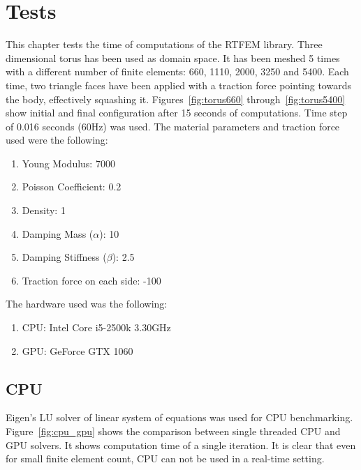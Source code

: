 \documentclass[en]{minipw} %
\begin{document}

\chapter{Tests}
\label{chap:tests}
This chapter tests the time of computations of the RTFEM library. Three dimensional torus has been used as domain space. It has been meshed 5 times with a different number of finite elements: 660, 1110, 2000, 3250 and 5400. Each time, two triangle faces have been applied with a traction force pointing towards the body, effectively squashing it. Figures~\ref{fig:torus660} through~\ref{fig:torus5400} show initial and final configuration after 15 seconds of computations. Time step of 0.016 seconds (60Hz) was used. The material parameters and traction force used were the following:
\begin{enumerate}
\item Young Modulus: 7000
\item Poisson Coefficient: 0.2
\item Density: 1
\item Damping Mass ($\alpha$): 10
\item Damping Stiffness ($\beta$): 2.5
\item Traction force on each side: -100
\end{enumerate}

The hardware used was the following:
\begin{enumerate}
\item CPU: Intel Core i5-2500k 3.30GHz
\item GPU: GeForce GTX 1060
\end{enumerate}

\section{CPU}

Eigen's LU solver of linear system of equations was used for CPU benchmarking. Figure~\ref{fig:cpu_gpu} shows the comparison between single threaded CPU and GPU solvers. It shows computation time of a single iteration. It is clear that even for small finite element count, CPU can not be used in a real-time setting.
\end{document}
